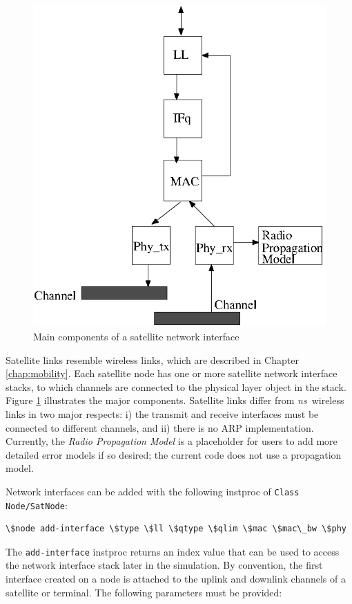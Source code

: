 \begin{figure}
    \centerline{\includegraphics{sat-stack-basic}}
    \caption{Main components of a satellite network interface}
    \label{fig:sat-stack-basic}
\end{figure}

Satellite links resemble wireless links, which are described in Chapter
\ref{chap:mobility}.  Each satellite
node has one or more satellite network interface stacks, to which
channels are connected to the physical layer object in the stack.  Figure
\ref{fig:sat-stack-basic} illustrates the major components.  Satellite
links differ from \emph{ns}~wireless links in two major respects:  i) the
transmit and receive interfaces must be connected to different channels,
and ii) there is no ARP implementation.  Currently, the {\em
Radio Propagation Model} is a placeholder for users to add more detailed
error models if so desired; the current code does not use a propagation
model.

Network interfaces can be added with the following instproc of
{\tt Class Node/SatNode}:
\begin{verbatim}
\$node add-interface \$type \$ll \$qtype \$qlim \$mac \$mac\_bw \$phy
\end{verbatim}
The {\tt add-interface} instproc returns an index value that can be used
to access the network interface stack later in the simulation.  By convention,
the first interface created on a node is attached to the uplink and downlink
channels of a satellite or terminal.  The
following parameters must be provided:

